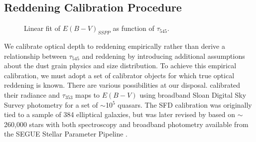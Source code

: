\documentclass{emulateapj}
\begin{document}
\subsection{Reddening Calibration Procedure}

\begin{figure}
\begin{center}
\caption{\label{fig:calib} Linear fit of $E(B-V)_{SSPP}$ as function of
$\tau_{545}$.}
\end{center}
\end{figure}

We calibrate optical depth to reddening empirically rather than derive a 
relationship between $\tau_{545}$ and reddening by introducing additional 
assumptions about the dust grain physics and size distribution. To achieve this
empirical calibration, we must adopt a set of calibrator objects for which true
optical reddening is known. There are various possibilities at our disposal. 
\cite{planckdust} calibrated their radiance and $\tau_{353}$ maps to $E(B-V)$ 
using broadband Sloan Digital Sky Survey \citep[SDSS;][]{sdss} photometry for a
set of $\sim$10$^5$ quasars. The SFD calibration was originally tied to a 
sample of 384 elliptical galaxies, but was later revised by 
\citet[hereafter SF11]{schlafly11} based on $\sim$260,000 stars with both 
spectroscopy and broadband photometry available from the SEGUE Stellar 
Parameter Pipeline \citep[SSPP,][]{sspp}.


\begin{figure*}
\begin{center}
\caption{\label{fig:resid} (top left) Residuals of $E(B-V)_{2comp}$ relative to
$E(B-V)_{SSPP}$ as a function of $E(B-V)_{SFD}$. The grayscale represents the 
conditional probability within each $E(B-V)_{SFD}$ bin. The central black line 
shows the moving median. The upper and lower black lines represent the moving 
75th and 25th percentiles respectively. (bottom left) Residuals of 
$E(B-V)_{2comp}$ relative to $E(B-V)_{SSPP}$ as a function of hot dust 
temperature $T_2$. (top right) Same as top left, but illustrating the residuals
of $E(B-V)_{mbb}$, our calibration of the \cite{planckdust} $\tau_{353}$ to 
$E(B-V)_{SSPP}$. (bottom right)  Same as bottom left, but showing the 
$E(B-V)_{mbb}$ residuals as a function of the single-MBB dust temperature from 
\cite{planckdust}. The temperature axes always range from the 
0.4$^{th}$ percentile to 99.6$^{th}$ percentile temperature values.}
\end{center}
\end{figure*}
\end{document}
